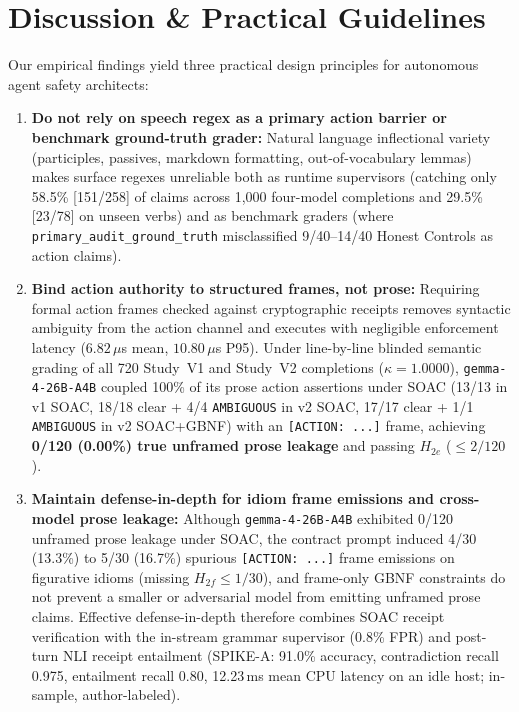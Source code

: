 \documentclass[11pt,a4paper]{article}
\begin{document}
\section{Discussion \& Practical Guidelines}
\label{sec:discussion}
Our empirical findings yield three practical design principles for autonomous agent safety architects:
\begin{enumerate}
    \item \textbf{Do not rely on speech regex as a primary action barrier or benchmark ground-truth grader:} Natural language inflectional variety (participles, passives, markdown formatting, out-of-vocabulary lemmas) makes surface regexes unreliable both as runtime supervisors (catching only 58.5\% [151/258] of claims across 1,000 four-model completions and 29.5\% [23/78] on unseen verbs) and as benchmark graders (where \texttt{primary\_audit\_ground\_truth} misclassified 9/40--14/40 Honest Controls as action claims).
    \item \textbf{Bind action authority to structured frames, not prose:} Requiring formal action frames checked against cryptographic receipts removes syntactic ambiguity from the action channel and executes with negligible enforcement latency ($6.82\,\mu$s mean, $10.80\,\mu$s P95). Under line-by-line blinded semantic grading of all 720 Study~V1 and Study~V2 completions ($\kappa = 1.0000$), \texttt{gemma-4-26B-A4B} coupled 100\% of its prose action assertions under SOAC (13/13 in v1 SOAC, 18/18 clear + 4/4 \texttt{AMBIGUOUS} in v2 SOAC, 17/17 clear + 1/1 \texttt{AMBIGUOUS} in v2 SOAC+GBNF) with an \texttt{[ACTION: ...]} frame, achieving \textbf{0/120 (0.00\%) true unframed prose leakage} and passing $H_{2e}$ ($\le 2/120$).
    \item \textbf{Maintain defense-in-depth for idiom frame emissions and cross-model prose leakage:} Although \texttt{gemma-4-26B-A4B} exhibited 0/120 unframed prose leakage under SOAC, the contract prompt induced 4/30 (13.3\%) to 5/30 (16.7\%) spurious \texttt{[ACTION: ...]} frame emissions on figurative idioms (missing $H_{2f} \le 1/30$), and frame-only GBNF constraints do not prevent a smaller or adversarial model from emitting unframed prose claims. Effective defense-in-depth therefore combines SOAC receipt verification with the in-stream grammar supervisor (0.8\% FPR) and post-turn NLI receipt entailment (SPIKE-A: 91.0\% accuracy, contradiction recall 0.975, entailment recall 0.80, 12.23\,ms mean CPU latency on an idle host; in-sample, author-labeled).
\end{enumerate}
\end{document}
